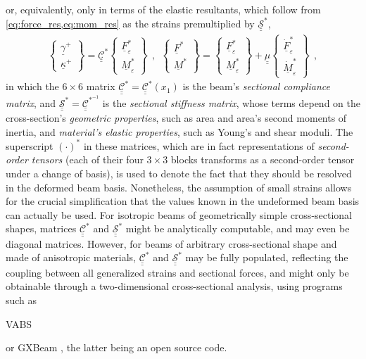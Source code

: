 \documentclass[12pt,a4paper,oneside,english]{abntex2} %
\newcommand{\fix}[1]{{\color{red}#1}}
\newcommand{\vect}[1]{\underline{#1}}
\def\tens#1{\underline{\underline{#1}}}
\def\lp{\left(}
\def\rp{\right)}
\def\xo{x_1}
\def\gam{\vect{\gamma}}
\def\gamp{\gam^{+}}
\def\kap{\vect{\kappa}}
\def\kapp{\kap^{+}}
\def\F{\vect{F}}
\def\Fs{\F^*}
\def\M{\vect{M}}
\def\Ms{\M^*}
\def\Stiff{\mathcal{\tens{S}}^*}
\def\Compliance{\mathcal{\tens{C}}^*}
\def\Fseps{\F^*_{\varepsilon}}
\def\Mseps{\M^*_{\varepsilon}}
\def\Fsepsdot{\dot{\F}^*_{\varepsilon}}
\def\Msepsdot{\dot{\M}^*_{\varepsilon}}
\begin{document}
\fix{or, equivalently, only in terms of the elastic resultants, which follow from \cref{eq:force_res,eq:mom_res} as the strains premultiplied by $\Stiff$,
\begin{align}
    \begin{Bmatrix}
    \gamp \\ \kapp
    \end{Bmatrix}
	= \Compliance
	\begin{Bmatrix}
    \Fseps \\ \Mseps
    \end{Bmatrix}
    \ \ , \ \ 
    \begin{Bmatrix}
    \Fs \\ \Ms
    \end{Bmatrix}
	= 
	\begin{Bmatrix}
    \Fseps \\ \Mseps
    \end{Bmatrix}
    + \tens{\mu}
    \begin{Bmatrix}
    \Fsepsdot \\ \Msepsdot
    \end{Bmatrix} \ \ ,
    \label{eq:constitutive_eps}
\end{align}
}in which the $6 \times 6$ matrix \fix{$\Compliance=\Compliance(\xo)$} is the beam's \textit{sectional compliance matrix}, and  $\Stiff = \mathcal{\tens{C}}^{*^{-1}}$ is the  \textit{sectional stiffness matrix}, whose terms depend on the cross-section's \textit{geometric properties}, such as area and area's second moments of inertia, and \textit{material's elastic properties}, such as Young's and shear moduli. The superscript $\lp\cdot\rp^*$ in these matrices, which are in fact representations of \fix{\textit{second-order tensors} (each of their four $3\times3$ blocks transforms as a second-order tensor under a change of basis)}, is used to denote the fact that they should be resolved in the deformed beam basis. Nonetheless, the assumption of small strains allows for the crucial simplification that the values known in the undeformed beam basis can actually be used. For isotropic beams of geometrically simple cross-sectional shapes, matrices $\Compliance$ and $\Stiff$ might be analytically computable, and may even be diagonal matrices. However, for beams of arbitrary cross-sectional shape and made of anisotropic materials, $\Compliance$ and $\Stiff$ may be fully populated, reflecting the coupling between all generalized strains and sectional forces, and might only be obtainable through a two-dimensional cross-sectional analysis, using programs such as \begin{small}VABS\end{small} \cite{hodges2006nonlinear} or GXBeam \cite{mcdonnell2022gxbeam}, the latter being an open source code.
\end{document}

